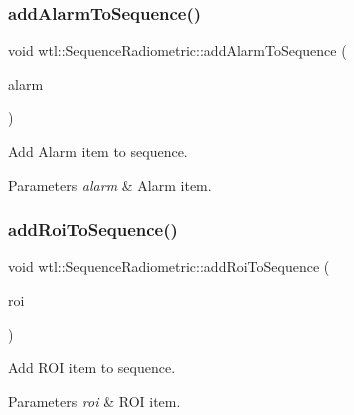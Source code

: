 \subsubsection{\texorpdfstring{add\+Alarm\+To\+Sequence()}{addAlarmToSequence()}}
{\footnotesize\ttfamily void wtl\+::\+Sequence\+Radiometric\+::add\+Alarm\+To\+Sequence (\begin{DoxyParamCaption}\item[{std\+::shared\+\_\+ptr$<$ \hyperlink{structwtl_1_1_alarm_struct}{Alarm\+Struct} $>$}]{alarm }\end{DoxyParamCaption})}



Add Alarm item to sequence. 


\begin{DoxyParams}{Parameters}
{\em alarm} & Alarm item. \\
\hline
\end{DoxyParams}
\mbox{\label{classwtl_1_1_sequence_radiometric_a3cca0f0bbabe787926910bcedd9307ea}} 
\subsubsection{\texorpdfstring{add\+Roi\+To\+Sequence()}{addRoiToSequence()}}
{\footnotesize\ttfamily void wtl\+::\+Sequence\+Radiometric\+::add\+Roi\+To\+Sequence (\begin{DoxyParamCaption}\item[{std\+::shared\+\_\+ptr$<$ \hyperlink{structwtl_1_1_roi_struct}{Roi\+Struct} $>$}]{roi }\end{DoxyParamCaption})}



Add R\+OI item to sequence. 


\begin{DoxyParams}{Parameters}
{\em roi} & R\+OI item. \\
\hline
\end{DoxyParams}
\mbox{\label{classwtl_1_1_sequence_radiometric_acff97bda5576bfb082cc5708c9a35200}} 
